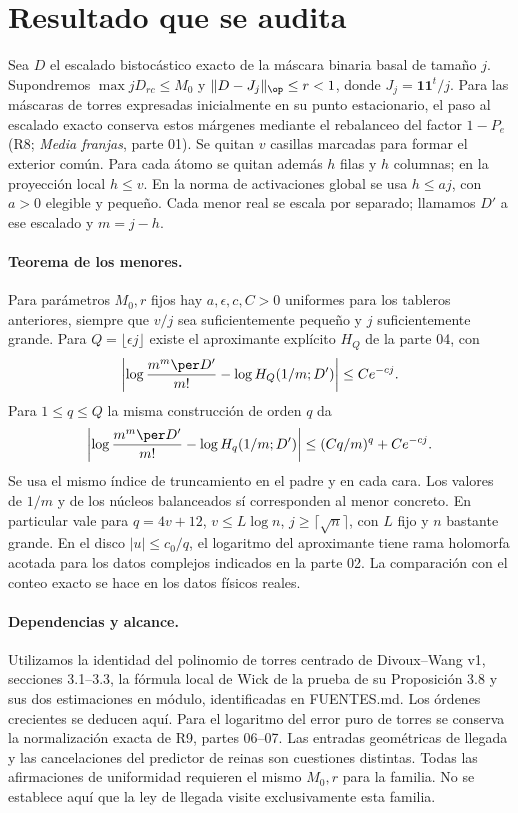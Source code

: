 \section{Resultado que se audita}
Sea $D$ el escalado bistocástico exacto de la máscara binaria basal de tamaño $j$.
Supondremos $\max jD_{rc}\le M_0$ y $\|D-J_j\|_{\op}\le r<1$, donde
$J_j=\mathbf1\mathbf1^t/j$. Para las máscaras de torres expresadas inicialmente
en su punto estacionario, el paso al escalado exacto conserva estos márgenes mediante
el rebalanceo del factor $1-P_e$ (R8; \emph{Media franjas}, parte 01).
Se quitan $v$ casillas marcadas para formar el exterior común. Para cada átomo se
quitan además $h$ filas y $h$ columnas; en la proyección local $h\le v$.
En la norma de activaciones global se usa $h\le aj$, con $a>0$ elegible y pequeño.
Cada menor real se escala por separado; llamamos $D'$ a ese escalado y $m=j-h$.
\paragraph{Teorema de los menores.}
Para parámetros $M_0,r$ fijos hay $a,\epsilon,c,C>0$ uniformes para los tableros
anteriores, siempre que $v/j$ sea suficientemente pequeño y $j$ suficientemente grande.
Para $Q=\lfloor\epsilon j\rfloor$ existe el aproximante explícito $H_Q$ de la parte 04, con
\[
 \left|\log\frac{m^m\per D'}{m!}-\log H_Q(1/m;D')\right|\le Ce^{-cj}.
\]
Para $1\le q\le Q$ la misma construcción de orden $q$ da
\[
 \left|\log\frac{m^m\per D'}{m!}-\log H_q(1/m;D')\right|
       \le (Cq/m)^q+Ce^{-cj}.
\]
Se usa el mismo índice de truncamiento en el padre y en cada cara. Los valores de
$1/m$ y de los núcleos balanceados sí corresponden al menor concreto.
En particular vale para $q=4v+12$, $v\le L\log n$, $j\ge\lceil\sqrt n\rceil$,
con $L$ fijo y $n$ bastante grande. En el disco $|u|\le c_0/q$, el logaritmo
del aproximante tiene rama holomorfa acotada para los datos complejos indicados
en la parte 02. La comparación con el conteo exacto se hace en los datos físicos reales.
\paragraph{Dependencias y alcance.}
Utilizamos la identidad del polinomio de torres centrado de Divoux--Wang v1,
secciones 3.1--3.3, la fórmula local de Wick de la prueba de su Proposición 3.8
y sus dos estimaciones en módulo, identificadas en FUENTES.md. Los órdenes
crecientes se deducen aquí. Para el logaritmo del error puro de torres se conserva
la normalización exacta de R9, partes 06--07. Las entradas geométricas de llegada
y las cancelaciones del predictor de reinas son cuestiones distintas.
Todas las afirmaciones de uniformidad requieren el mismo $M_0,r$ para la familia.
No se establece aquí que la ley de llegada visite exclusivamente esta familia.

